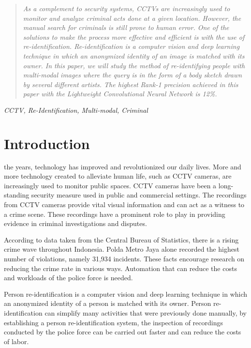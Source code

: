 \documentclass[conference]{IEEEtran}
\begin{document}
	\begin{abstract}
		\textit{As a complement to security systems, CCTVs are increasingly used to monitor and analyze criminal acts done at a given location. However, the manual search for criminals is still prone to human error. One of the solutions to make the process more effective and efficient is with the use of re-identification.
		Re-identification is a computer vision and deep learning technique in which an anonymized identity of an image is matched with its owner. In this paper, we will study the method of re-identifying people with multi-modal images where the query is in the form of a body sketch drawn by several different artists. The highest Rank-1 precision achieved in this paper with the Lightweight Convolutional Neural Network is 12\%.}
		
	\end{abstract}
	\begin{IEEEkeywords}
		\textit{CCTV, Re-Identification, Multi-modal, Criminal}
	\end{IEEEkeywords}
	
	\section{Introduction}
	 the years, technology has improved and revolutionized our daily lives. More and more technology created to alleviate human life, such as CCTV cameras, are increasingly used to monitor public spaces. CCTV cameras have been a long-standing security measure used in public and commercial settings. The recordings from CCTV cameras provide vital visual information and can act as a witness to a crime scene. These recordings have a prominent role to play in providing evidence in criminal investigations and disputes.
	
	\vspace{1ex}
	
	According to data taken from the Central Bureau of Statistics, there is a rising crime wave throughout Indonesia. Polda Metro Jaya alone recorded the highest number of violations, namely 31,934 incidents\cite{cit:1, cit:2, cit:3, cit:4}. These facts encourage research on reducing the crime rate in various ways. Automation that can reduce the costs and workloads of the police force is needed. 
	
	\vspace{1ex}
	
	Person re-identification is a computer vision and deep learning technique in which an anonymized identity of a person is matched with its owner. Person re-identification can simplify many activities that were previously done manually, by establishing a person re-identification system, the inspection of recordings conducted by the police force can be carried out faster and can reduce the costs of labor.
	
\end{document}
